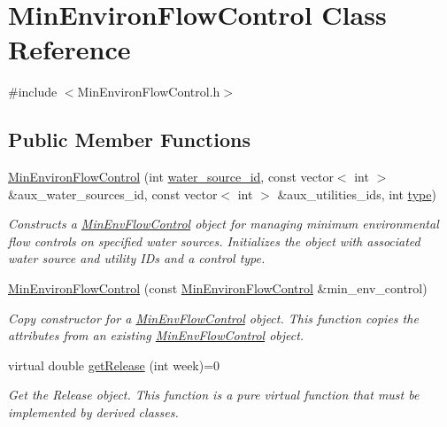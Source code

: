 \hypertarget{classMinEnvironFlowControl}{}\section{Min\+Environ\+Flow\+Control Class Reference}
\label{classMinEnvironFlowControl}


{\ttfamily \#include $<$Min\+Environ\+Flow\+Control.\+h$>$}

\subsection*{Public Member Functions}
\begin{DoxyCompactItemize}
\item 
\mbox{\hyperlink{classMinEnvironFlowControl_a5b40c3f8da8c63513edb30804bf2ca01}{Min\+Environ\+Flow\+Control}} (int \mbox{\hyperlink{classMinEnvironFlowControl_a571d4d56086eb752aebb20b2d85fa8e7}{water\+\_\+source\+\_\+id}}, const vector$<$ int $>$ \&aux\+\_\+water\+\_\+sources\+\_\+id, const vector$<$ int $>$ \&aux\+\_\+utilities\+\_\+ids, int \mbox{\hyperlink{classMinEnvironFlowControl_a1a10a6b5720c934eef698cd72c9d883c}{type}})
\begin{DoxyCompactList}\small\item\em Constructs a {\ttfamily \mbox{\hyperlink{classMinEnvFlowControl}{Min\+Env\+Flow\+Control}}} object for managing minimum environmental flow controls on specified water sources. Initializes the object with associated water source and utility I\+Ds and a control type. \end{DoxyCompactList}\item 
\mbox{\hyperlink{classMinEnvironFlowControl_a274fc5217a2a79d9c488d903708f5e68}{Min\+Environ\+Flow\+Control}} (const \mbox{\hyperlink{classMinEnvironFlowControl}{Min\+Environ\+Flow\+Control}} \&min\+\_\+env\+\_\+control)
\begin{DoxyCompactList}\small\item\em Copy constructor for a {\ttfamily \mbox{\hyperlink{classMinEnvFlowControl}{Min\+Env\+Flow\+Control}}} object. This function copies the attributes from an existing {\ttfamily \mbox{\hyperlink{classMinEnvFlowControl}{Min\+Env\+Flow\+Control}}} object. \end{DoxyCompactList}\item 
virtual double \mbox{\hyperlink{classMinEnvironFlowControl_ac7357455a533f7e6882cdb1ef303359b}{get\+Release}} (int week)=0
\begin{DoxyCompactList}\small\item\em Get the Release object. This function is a pure virtual function that must be implemented by derived classes. \end{DoxyCompactList}\item 

\end{DoxyCompactItemize}
